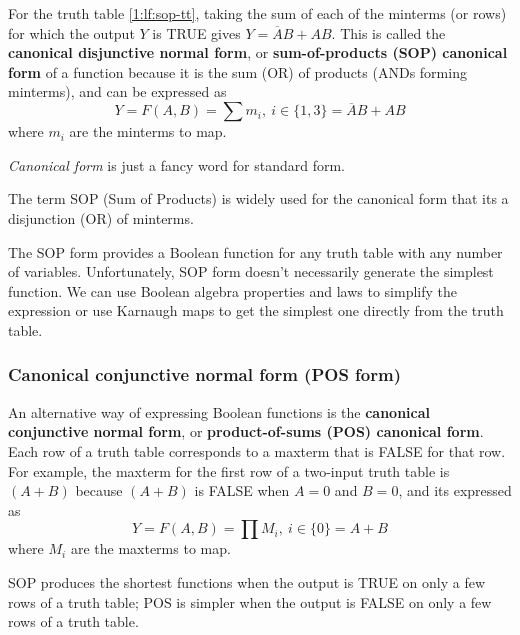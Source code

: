 For the truth table \ref{1:lf:sop-tt}, taking the sum of each of the minterms (or rows) for which the output $Y$ is TRUE gives $Y = \overline{A}B + AB$. This is called the \textbf{canonical disjunctive normal form}, or \textbf{sum-of-products (SOP) canonical form} of a function because it is the sum (OR) of products (ANDs forming minterms), and can be expressed as
\begin{equation}
    Y = F\left( A, B \right) = \sum m_i,\ i\in \{1, 3\} = \overline{A}B + AB 
\end{equation}
where $m_i$ are the minterms to map.

\begin{note}
    \textit{Canonical form} is just a fancy word for standard form.
\end{note}
\begin{note}
The term SOP (Sum of Products) is widely used for the canonical form that its a disjunction (OR) of minterms.
\end{note}

The SOP form provides a Boolean function for any truth table with any number of variables. Unfortunately, SOP form doesn't necessarily generate the simplest function. We can use Boolean algebra properties and laws to simplify the expression or use Karnaugh maps to get the simplest one directly from the truth table.

\subsubsection{Canonical conjunctive normal form (POS form)}
An alternative way of expressing Boolean functions is the \textbf{canonical conjunctive normal form}, or \textbf{product-of-sums (POS) canonical form}. Each row of a truth table corresponds to a maxterm that is FALSE for that row. For example, the maxterm for the first row of a two-input truth table is $\left( A + B \right)$ because $\left( A + B \right)$ is FALSE when $A = 0$ and $B = 0$, and its expressed as
\begin{equation}
    Y = F\left( A, B \right) = \prod M_i,\ i\in \{0\} = A + B 
\end{equation}
where $M_i$ are the maxterms to map.

SOP produces the shortest functions when the output is TRUE on only a few rows of a truth table; POS is simpler when the output is FALSE on only a few rows of a truth table.






